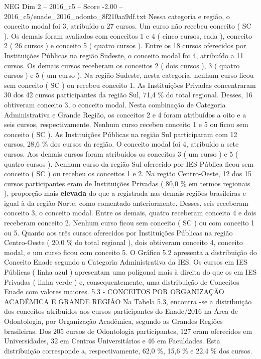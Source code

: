 \begin{textsample}{NEG Dim 2 – 2016\_c5 – Score -2.00 – 2016\_c5/enade\_2016\_odonto\_8f210aa9df.txt}
Nessa categoria e região, o conceito modal foi 3, atribuído a 27 cursos.
Um curso não recebeu conceito ( SC ).
Os demais foram avaliados com conceitos 1 e 4 ( cinco cursos, cada ), conceito 2 ( 26 cursos ) e conceito 5 ( quatro cursos ).
Entre os 18 cursos oferecidos por Instituições Públicas na região Sudeste, o conceito modal foi 4, atribuído a 11 cursos.
Os demais cursos receberam os conceitos 2 ( dois cursos ), 3 ( quatro cursos ) e 5 ( um curso ).
Na região Sudeste, nesta categoria, nenhum curso ficou sem conceito ( SC ) ou recebeu conceito 1.
As Instituições Privadas concentraram 30 dos 42 cursos participantes da região Sul, 71,4 \% do total regional.
Desses, 16 obtiveram conceito 3, o conceito modal.
Nesta combinação de Categoria Administrativa e Grande Região, os conceitos 2 e 4 foram atribuídos a oito e a seis cursos, respectivamente.
Nenhum curso recebeu conceito 1 e 5 ou ficou sem conceito ( SC ).
As Instituições Públicas na região Sul participaram com 12 cursos, 28,6 \% dos cursos da região.
O conceito modal foi 4, atribuído a sete cursos.
Aos demais cursos foram atribuídos os conceitos 3 ( um curso ) e 5 ( quatro cursos ).
Nenhum curso da região Sul oferecido por IES Pública ficou sem conceito ( SC ) ou recebeu os conceitos 1 e 2.
Na região Centro-Oeste, 12 dos 15 cursos participantes eram de Instituições Privadas ( 80,0 \% em termos regionais ), proporção mais \textbf{elevada} do que a registrada nas demais regiões brasileiras e igual à da região Norte, como comentado anteriormente.
Desses, seis receberam conceito 3, o conceito modal.
Entre os demais, quatro receberam conceito 4 e dois receberam conceito 2.
Nenhum curso ficou sem conceito ( SC ) ou com conceito 1 ou 5.
Quanto aos três cursos oferecidos por Instituições Públicas na região Centro-Oeste ( 20,0 \% do total regional ), dois obtiveram conceito 4, conceito modal, e um curso ficou com conceito 5.
O Gráfico 5.2 apresenta a distribuição do Conceito Enade segundo a Categoria Administrativa da IES.
Os cursos em IES Públicas ( linha azul ) apresentam uma poligonal mais à direita do que os em IES Privadas ( linha verde ) e, consequentemente, uma distribuição de Conceitos Enade com valores maiores. 5.3 - CONCEITOS POR ORGANIZAÇÃO ACADÊMICA E GRANDE REGIÃO Na Tabela 5.3, encontra -se a distribuição dos conceitos atribuídos aos cursos participantes do Enade/2016 na Área de Odontologia, por Organização Acadêmica, segundo as Grandes Regiões brasileiras.
Dos 205 cursos de Odontologia participantes, 127 eram oferecidos em Universidades, 32 em Centros Universitários e 46 em Faculdades.
Esta distribuição corresponde a, respectivamente, 62,0 \%, 15,6 \% e 22,4 \% dos cursos.

\end{textsample}
